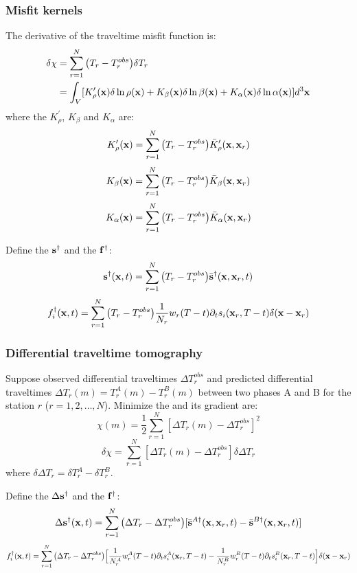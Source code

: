 \subsubsection{Misfit kernels}
The \Frechet derivative of the traveltime misfit function is:
\begin{align*}
  \delta\chi & =\sum_{r=1}^N\big(T_r-T_r^{obs}\big)\delta T_r \\
    & =\int_V[K_\rho^\prime(\mathbf{x})\delta\ln\rho(\mathbf{x})+K_\beta(\mathbf{x})\delta\ln\beta(\mathbf{x})+K_\alpha(\mathbf{x})\delta\ln\alpha(\mathbf{x})]d^3\mathbf{x}
\end{align*}
where the  $K_\rho^\prime$, $K_\beta$ and $K_\alpha$ are:
\[ K_\rho^\prime(\mathbf{x})=\sum_{r=1}^N\big(T_r-T_r^{obs}\big)\bar K_\rho^\prime(\mathbf{x},\mathbf{x}_r) \]
\[ K_\beta(\mathbf{x})=\sum_{r=1}^N\big(T_r-T_r^{obs}\big)\bar K_\beta(\mathbf{x},\mathbf{x}_r) \]
\[ K_\alpha(\mathbf{x})=\sum_{r=1}^N\big(T_r-T_r^{obs}\big)\bar K_\alpha(\mathbf{x},\mathbf{x}_r) \]

Define the  $\mathbf{s}^\dagger$
and the  $\mathbf{f}^\dagger$:
\[ \mathbf{s}^\dagger(\mathbf{x},t)=\sum_{r=1}^N\big(T_r-T_r^{obs}\big)\bar{\mathbf{s}}^\dagger(\mathbf{x},\mathbf{x}_r,t) \]
\[ f_i^\dagger(\mathbf{x},t)=\sum_{r=1}^N\big(T_r-T_r^{obs}\big)\frac{1}{N_r}w_r(T-t)\partial_ts_i(\mathbf{x}_r,T-t)\delta(\mathbf{x}-\mathbf{x}_r) \]

\subsubsection{Differential traveltime tomography}
Suppose observed differential traveltimes $\Delta T_r^{obs}$
and predicted differential traveltimes $\Delta T_r(m)=T_r^A(m)-T_r^B(m)$
between two phases A and B for the station $r$ ($r=1,2,\ldots,N$).
Minimize the  and its gradient are:
\[ \chi(m)=\frac{1}{2}\sum_{r=1}^N[\Delta T_r(m)-\Delta T_r^{obs}]^2 \]
\[ \delta\chi=\sum_{r=1}^N[\Delta T_r(m)-\Delta T_r^{obs}]\delta\Delta T_r \]
where $\delta\Delta T_r=\delta T_r^A-\delta T_r^B$.

Define the  $\Delta\mathbf{s}^\dagger$
and the  $\mathbf{f}^\dagger$:
\[ \Delta\mathbf{s}^\dagger(\mathbf{x},t)=\sum_{r=1}^N\big(\Delta T_r-\Delta T_r^{obs}\big)[\bar{\mathbf{s}}^{A\dagger}(\mathbf{x},\mathbf{x}_r,t)-\bar{\mathbf{s}}^{B\dagger}(\mathbf{x},\mathbf{x}_r,t)] \]
\[ f_i^\dagger(\mathbf{x},t)=\sum_{r=1}^N\big(\Delta T_r-\Delta T_r^{obs}\big)\Big[\frac{1}{N_r^A}w_r^A(T-t)\partial_ts_i^A(\mathbf{x}_r,T-t)-\frac{1}{N_r^B}w_r^B(T-t)\partial_ts_i^B(\mathbf{x}_r,T-t)\Big]\delta(\mathbf{x}-\mathbf{x}_r) \]

